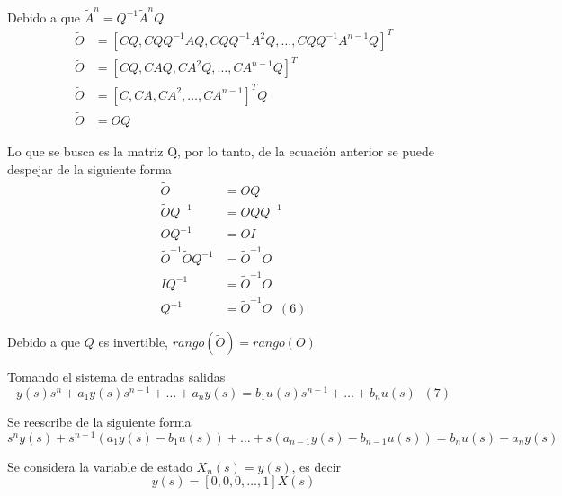Debido a que \( \tilde{A}^{n} = Q^{-1}\tilde{A}^{n}Q \)
\[
    \begin{split}
        \tilde{O} & = [CQ, CQQ^{-1}AQ, CQQ^{-1}A^{2}Q, \ldots, CQQ^{-1}A^{n-1}Q]^{T} \\
        \tilde{O} & = [CQ, CAQ, CA^{2}Q, \ldots, CA^{n-1}Q]^{T} \\
        \tilde{O} & = [C, CA, CA^{2}, \ldots, CA^{n-1}]^{T}Q \\
        \tilde{O} & = OQ 
    \end{split}
\]

Lo que se busca es la matriz Q, por lo tanto, de la ecuación anterior se puede despejar de la siguiente forma
\[
    \begin{split}
        \tilde{O} & = OQ \\
        \tilde{O}Q^{-1} & = OQQ^{-1} \\
        \tilde{O}Q^{-1} & = OI \\
        \tilde{O}^{-1}\tilde{O}Q^{-1} & = \tilde{O}^{-1}O \\
        IQ^{-1} & = \tilde{O}^{-1}O \\
        Q^{-1} & = \tilde{O}^{-1}O \;\; (6)
    \end{split}
\]

Debido a que \( Q \) es invertible, \( rango(\tilde{O}) = rango(O)\) 

Tomando el sistema de entradas salidas
\[
    y(s)s^{n} + a_{1}y(s)s^{n-1} + \ldots + a_{n}y(s) = b_{1}u(s)s^{n-1} + \ldots + b_{n}u(s) \;\; (7)
\]

Se reescribe de la siguiente forma
\[
    s^{n}y(s) + s^{n-1}(a_{1}y(s) - b_{1}u(s)) + \ldots + s(a_{n-1}y(s) - b_{n-1}u(s)) = b_{n}u(s) - a_{n}y(s) 
\]

Se considera la variable de estado \( X_{n}(s) = y(s) \), es decir
\[
    y(s) = [0, 0, 0, \ldots, 1]X(s)
\]

